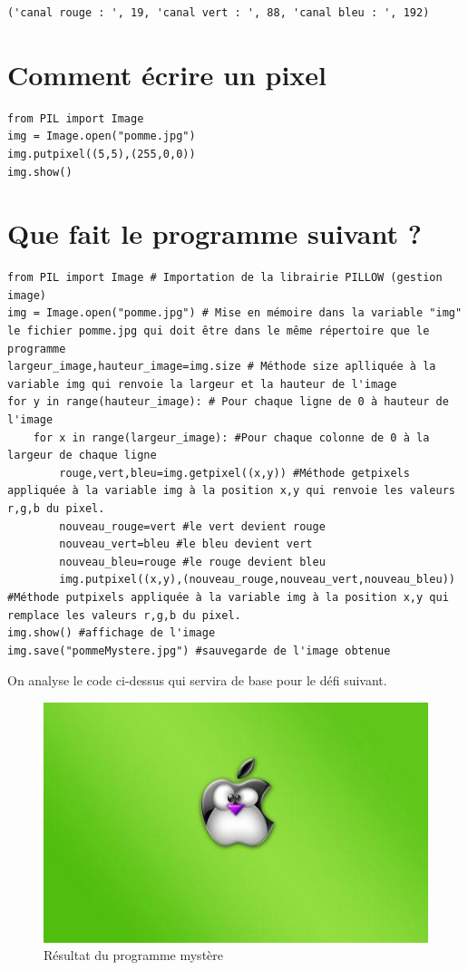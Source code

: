 \documentclass[11pt]{article}
\begin{document}
\begin{verbatim}
('canal rouge : ', 19, 'canal vert : ', 88, 'canal bleu : ', 192)
\end{verbatim}


\section{Comment écrire un pixel}
\label{sec:org5013023}

\begin{verbatim}
from PIL import Image
img = Image.open("pomme.jpg")
img.putpixel((5,5),(255,0,0))
img.show()
\end{verbatim}


\section{Que fait le programme suivant ?}
\label{sec:org9d9c5ab}

\begin{verbatim}
from PIL import Image # Importation de la librairie PILLOW (gestion image)
img = Image.open("pomme.jpg") # Mise en mémoire dans la variable "img" le fichier pomme.jpg qui doit être dans le même répertoire que le programme
largeur_image,hauteur_image=img.size # Méthode size aplliquée à la variable img qui renvoie la largeur et la hauteur de l'image
for y in range(hauteur_image): # Pour chaque ligne de 0 à hauteur de l'image
    for x in range(largeur_image): #Pour chaque colonne de 0 à la largeur de chaque ligne
        rouge,vert,bleu=img.getpixel((x,y)) #Méthode getpixels appliquée à la variable img à la position x,y qui renvoie les valeurs r,g,b du pixel.
        nouveau_rouge=vert #le vert devient rouge
        nouveau_vert=bleu #le bleu devient vert
        nouveau_bleu=rouge #le rouge devient bleu
        img.putpixel((x,y),(nouveau_rouge,nouveau_vert,nouveau_bleu)) #Méthode putpixels appliquée à la variable img à la position x,y qui remplace les valeurs r,g,b du pixel.
img.show() #affichage de l'image
img.save("pommeMystere.jpg") #sauvegarde de l'image obtenue
\end{verbatim}


On analyse le code ci-dessus qui servira de base pour le défi suivant.

\begin{figure}[htbp]
\centering
\includegraphics[width=.9\linewidth]{pommeMystere.jpg}
\caption{Résultat du programme mystère}
\end{figure}
\end{document}
